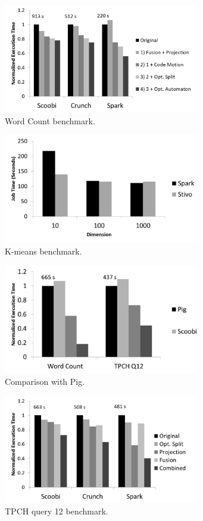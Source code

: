 \begin{figure}[!hbt]
    \includegraphics[width=8.6cm]{figures/word-count}
   \caption{Word Count benchmark.}
   \label{fig:word-count}%
\end{figure}

\begin{figure}[!hbt]
    \includegraphics[width=8.6cm]{figures/k-means}
   \caption{K-means benchmark.}
   \label{fig:k-means}%
\end{figure}

\begin{figure}[!hbt]
    \includegraphics[width=8.6cm]{figures/pig}
   \caption{Comparison with Pig.}
   \label{fig:pig}%
\end{figure}

\begin{figure}[!hbt]
    \includegraphics[width=8.6cm]{figures/tpch}

   \caption{TPCH query 12 benchmark.}
  \label{fig:tpch}%
\end{figure}

